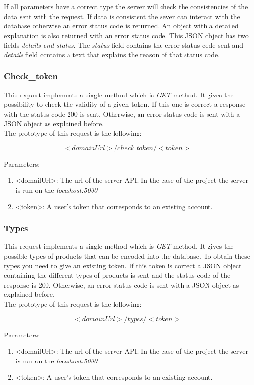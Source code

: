 If all parameters have a correct type the server will check the consistencies of the data sent with the request. If data is consistent the sever can interact with the database otherwise an error status code is returned. An object with a detailed explanation is also returned with an error status code. This JSON object has two fields \textit{details and status}. The \textit{status} field contains the error status code sent and \textit{details} field contains a text that explains the reason of that status code.
 
\subsubsection{Check\_token}
This request implements a single method which is \textit{GET} method. It gives the possibility to check the validity of a given token. If this one is correct a response with the status code 200 is sent. Otherwise, an error status code is sent with a JSON object as explained before.\\

The prototype of this request is the following:

$$<domainUrl>/check\_token/<token>$$

Parameters:
\begin{enumerate}
\item <domailUrl>: The url of the server API. In the case of the project the server is run on the \textit{localhost:5000}
\item <token>: A user's token that corresponds to an existing account.
\end{enumerate}

\subsubsection{Types}
This request implements a single method which is \textit{GET} method. It gives the possible types of products that can be encoded into the database. To obtain these types you need to give an existing token. If this token is correct a JSON object containing the different types of products is sent and the status code of the response is 200. Otherwise, an error status code is sent with a JSON object as explained before.\\

The prototype of this request is the following:

$$<domainUrl>/types/<token>$$

Parameters:
\begin{enumerate}
\item <domailUrl>: The url of the server API. In the case of the project the server is run on the \textit{localhost:5000}
\item <token>: A user's token that corresponds to an existing account.
\end{enumerate}

